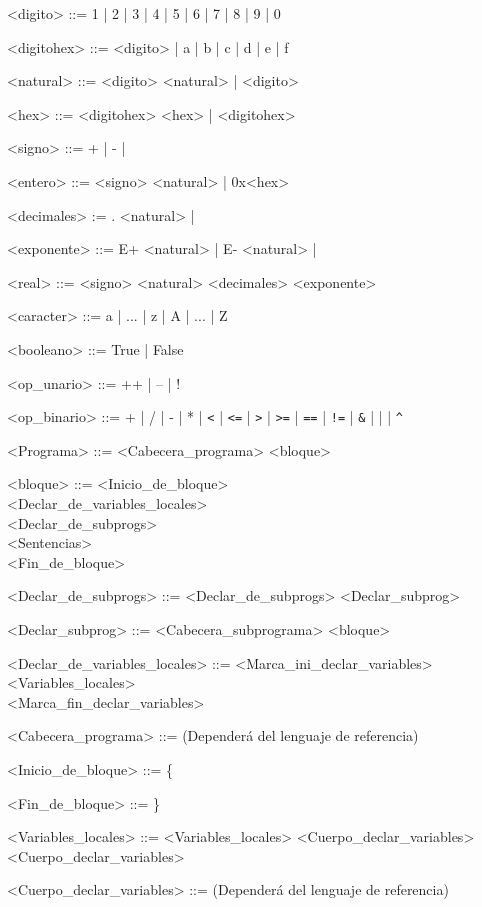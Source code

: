 \documentclass{scrartcl}
\begin{document}
\setlength{\grammarparsep}{4pt plus 1pt minus 1pt}
\begin{grammar}

<digito> ::= 1 | 2 | 3 | 4 | 5 | 6 | 7 | 8 | 9 | 0

<digitohex> ::= <digito> | a | b | c | d | e | f

<natural> ::= <digito> <natural> | <digito>

<hex> ::= <digitohex> <hex> | <digitohex>

<signo> ::= + | - |

<entero> ::= <signo> <natural> | 0x<hex>

<decimales> := . <natural> |

<exponente> ::= E+ <natural> | E- <natural> |

<real> ::= <signo> <natural> <decimales> <exponente>

<caracter> ::= a | ... | z | A | ... | Z

<booleano> ::= True | False

<op_unario> ::= ++ | -- | !

<op_binario> ::= + | / | - | * | \verb|<| | \verb|<=| | \verb|>| | \verb|>=| | \verb|==| | \verb|!=| | \verb|&| | \verb||| | \verb|^|

<Programa> ::= <Cabecera_programa> <bloque>

<bloque> ::= <Inicio_de_bloque> \\
 <Declar_de_variables_locales> \\
 <Declar_de_subprogs> \\
 <Sentencias> \\
 <Fin_de_bloque>

<Declar_de_subprogs> ::= <Declar_de_subprogs> <Declar_subprog>

<Declar_subprog> ::= <Cabecera_subprograma> <bloque>

<Declar_de_variables_locales> ::= <Marca_ini_declar_variables> \\
<Variables_locales> \\
<Marca_fin_declar_variables>

<Cabecera_programa> ::= (Dependerá del lenguaje de referencia)

<Inicio_de_bloque> ::= \{

<Fin_de_bloque> ::= \}

<Variables_locales> ::= <Variables_locales> <Cuerpo_declar_variables>
\alt <Cuerpo_declar_variables>

<Cuerpo_declar_variables> ::= (Dependerá del lenguaje de referencia)


\end{grammar}
\end{document}
